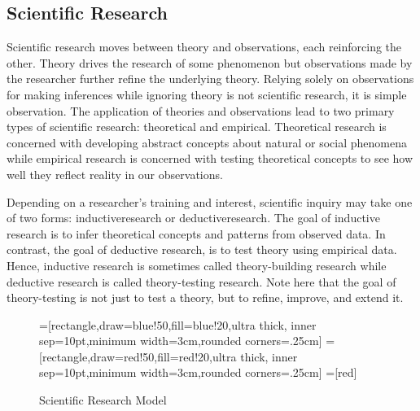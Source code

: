 \subsection{Scientific Research}

Scientific research moves between theory and observations, each reinforcing the other. Theory drives the research of some phenomenon but observations made by the researcher further refine the underlying theory. Relying solely on observations for making inferences while ignoring theory is not scientific research, it is simple observation. The application of theories and observations lead to two primary types of scientific research: theoretical and empirical. Theoretical research is concerned with developing abstract concepts about natural or social phenomena while empirical research is concerned with testing theoretical concepts to see how well they reflect reality in our observations. 

Depending on a researcher's training and interest, scientific inquiry may take one of two forms: \gls{inductiveresearch} or \gls{deductiveresearch}. The goal of inductive research is to infer theoretical concepts and patterns from observed data. In contrast, the goal of deductive research, is to test theory using empirical data. Hence, inductive research is sometimes called theory-building research while deductive research is called theory-testing research. Note here that the goal of theory-testing is not just to test a theory, but to refine, improve, and extend it. 

\begin{center}
	\begin{figure}[H]
		=[rectangle,draw=blue!50,fill=blue!20,ultra thick,
			inner sep=10pt,minimum width=3cm,rounded corners=.25cm]
		=[rectangle,draw=red!50,fill=red!20,ultra thick,
			inner sep=10pt,minimum width=3cm,rounded corners=.25cm]
		=[red]
		\caption{Scientific Research Model}
		\label{fig01.02}
	\end{figure}
\end{center}

